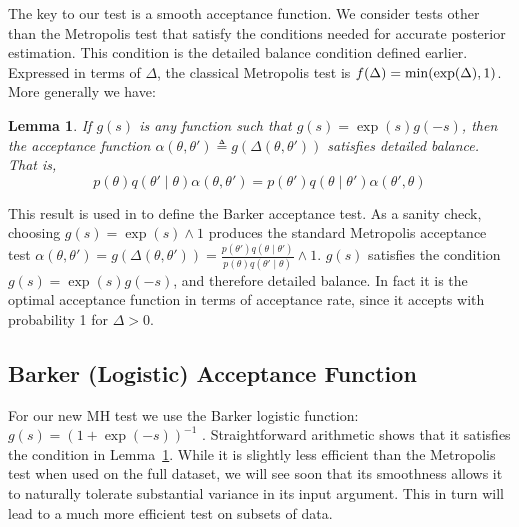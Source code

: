 \documentclass{article}
\newtheorem{lemma}{Lemma}
\begin{document}
The key to our test is a smooth acceptance function.  We consider tests other than the Metropolis
test that satisfy the conditions needed for accurate posterior estimation. This condition is
the detailed balance condition defined earlier. Expressed in terms of $\Delta$, the
classical Metropolis test is $f(\Delta) = {\rm min}(\exp(\Delta),1)$. More generally we have:

\begin{lemma}\label{lem:detailed_balance}
  If $g(s)$ is any function such that $g(s) = \exp(s) g(-s)$, then the acceptance function $\alpha(\theta,\theta') \triangleq  g(\Delta(\theta,\theta'))$ satisfies detailed balance. That is,
  \begin{equation}\label{detbal}
    p(\theta)q(\theta'\mid\theta)\alpha(\theta,\theta') = p(\theta')q(\theta\mid\theta')\alpha(\theta',\theta)
    \end{equation}

\end{lemma}

This result is used in \cite{Barker65} to define the Barker acceptance test. 
As a sanity check, choosing $g(s) = \exp(s) \wedge 1$ produces the
standard Metropolis acceptance test $\alpha(\theta,\theta') = g(\Delta(\theta,\theta')) = 
\frac{p(\theta')q(\theta \mid
  \theta')}{p(\theta)q(\theta' \mid \theta)}\wedge 1$. $g(s)$ satisfies
the condition $g(s) = \exp(s)g(-s)$, and therefore detailed
balance. In fact it is the optimal acceptance function in terms of
acceptance rate, since it accepts with probability 1 for $\Delta > 0$.

\subsection{Barker (Logistic) Acceptance Function}
For our new MH test we use the Barker logistic function:
$g(s)=(1+\exp(-s))^{-1}$ \cite{Barker65}. Straightforward arithmetic shows that it
satisfies the condition in Lemma~\ref{lem:detailed_balance}.  While it
is slightly less efficient than the Metropolis test when used on the
full dataset, we will see soon that its smoothness allows it to
naturally tolerate substantial variance in its input argument. This in
turn will lead to a much more efficient test on subsets of data.
\end{document}
